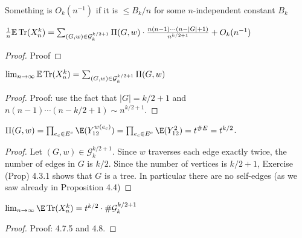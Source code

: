 \begin{definition}
  \label{def:big_o_with_base}
  \notready
  Something is $O_k(n^{-1})$ if it is $\le B_k/n$ for some $n$-independent constant $B_k$
\end{definition}

\begin{proposition}
  \label{prop:eqn_4_7}
  \notready
  $\frac1n{\mathbb{E}}\operatorname{Tr}(X_n^k) = \sum_{(G,w)\in\mathcal{G}^{k/2+1}_k} \Pi(G,w) \cdot \frac{n(n-1)\cdots(n-|G|+1)}{n^{k/2+1}} + O_k(n^{-1})$
\end{proposition}

\begin{proof}
  \notready
  Proof
\end{proof}




\begin{proposition}
  \label{prop:4_7_5}
  \notready
  $\lim_{n\to\infty}{\mathbb{E}}\operatorname{Tr}(X_n^k) = \sum_{(G,w)\in\mathcal{G}^{k/2+1}_k} \Pi(G,w)$
\end{proposition}

\begin{proof}
  \notready
  Proof: use the fact that $|G|=k/2+1$ and $n(n-1)\cdots(n-k/2+1) \sim n^{k/2+1}$.
\end{proof}




\begin{proposition}
  \label{prop:eqn_4_8}
  \notready
  $\Pi(G,w) = \prod_{e_c\in E^c} \E(Y_{12}^{w(e_c)}) = \prod_{e_c\in E^c} \E(Y_{12}^2) = t^{\#E} = t^{k/2}$.
\end{proposition}

\begin{proof}
  \notready
  Let $(G,w)\in\mathcal{G}^{k/2+1}_k$.  Since $w$ traverses each edge exactly twice, the number of edges in $G$ is $k/2$.  Since the number of vertices is $k/2+1$, Exercise (Prop) 4.3.1 shows that $G$ is a tree.  In particular there are no self-edges (as we saw already in Proposition 4.4)
\end{proof}




\begin{proposition}%
  \label{prop:limit_stuff}
  \notready
  $\lim_{n\to\infty} \E\Tr(X_n^k) = t^{k/2}\cdot\#\mathcal{G}_k^{k/2+1}$
\end{proposition}

\begin{proof}
  \notready
  Proof: 4.7.5 and 4.8.
\end{proof}
